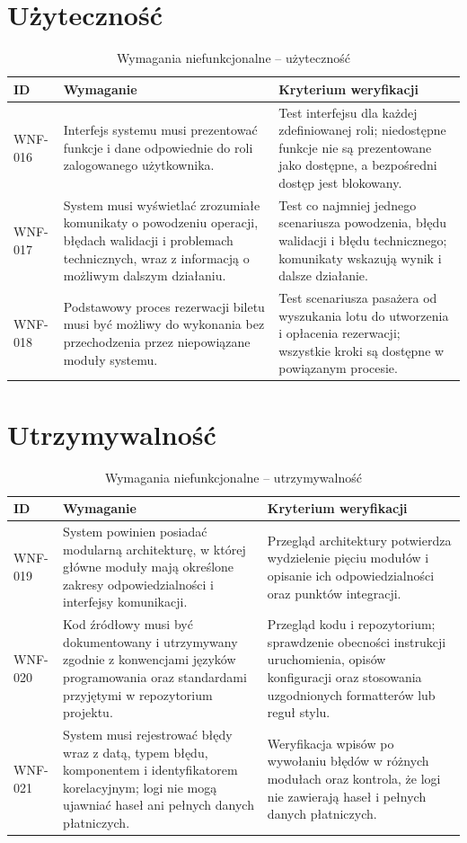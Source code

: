 \documentclass[12pt,a4paper,oneside]{report}
\begin{document}
\section{Użyteczność}
\begin{longtable}{|p{1.5cm}|p{8.4cm}|p{3.5cm}|}
\caption{Wymagania niefunkcjonalne -- użyteczność}\label{tab:wnf-uzytecznosc}\\\hline
\rowcolor{lightblue}\textbf{ID} & \textbf{Wymaganie} & \textbf{Kryterium weryfikacji}\\\hline
WNF-016 & Interfejs systemu musi prezentować funkcje i dane odpowiednie do roli zalogowanego użytkownika. & Test interfejsu dla każdej zdefiniowanej roli; niedostępne funkcje nie są prezentowane jako dostępne, a bezpośredni dostęp jest blokowany.\\\hline
WNF-017 & System musi wyświetlać zrozumiałe komunikaty o powodzeniu operacji, błędach walidacji i problemach technicznych, wraz z informacją o możliwym dalszym działaniu. & Test co najmniej jednego scenariusza powodzenia, błędu walidacji i błędu technicznego; komunikaty wskazują wynik i dalsze działanie.\\\hline
WNF-018 & Podstawowy proces rezerwacji biletu musi być możliwy do wykonania bez przechodzenia przez niepowiązane moduły systemu. & Test scenariusza pasażera od wyszukania lotu do utworzenia i opłacenia rezerwacji; wszystkie kroki są dostępne w powiązanym procesie.\\\hline
\end{longtable}

\section{Utrzymywalność}
\begin{longtable}{|p{1.5cm}|p{8.4cm}|p{3.5cm}|}
\caption{Wymagania niefunkcjonalne -- utrzymywalność}\label{tab:wnf-utrzymywalnosc}\\\hline
\rowcolor{lightblue}\textbf{ID} & \textbf{Wymaganie} & \textbf{Kryterium weryfikacji}\\\hline
WNF-019 & System powinien posiadać modularną architekturę, w której główne moduły mają określone zakresy odpowiedzialności i interfejsy komunikacji. & Przegląd architektury potwierdza wydzielenie pięciu modułów i opisanie ich odpowiedzialności oraz punktów integracji.\\\hline
WNF-020 & Kod źródłowy musi być dokumentowany i utrzymywany zgodnie z konwencjami języków programowania oraz standardami przyjętymi w repozytorium projektu. & Przegląd kodu i repozytorium; sprawdzenie obecności instrukcji uruchomienia, opisów konfiguracji oraz stosowania uzgodnionych formatterów lub reguł stylu.\\\hline
WNF-021 & System musi rejestrować błędy wraz z datą, typem błędu, komponentem i identyfikatorem korelacyjnym; logi nie mogą ujawniać haseł ani pełnych danych płatniczych. & Weryfikacja wpisów po wywołaniu błędów w różnych modułach oraz kontrola, że logi nie zawierają haseł i pełnych danych płatniczych.\\\hline
\end{longtable}
\end{document}
